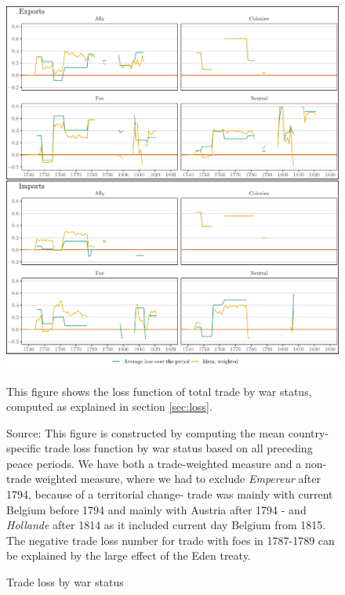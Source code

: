 \documentclass[12pt,a4paper,notitlepage,english]{article}
\newcommand{\fontsmall}{\fontsize{10pt}{12pt}\selectfont}
\newcommand{\source}[1]{\caption*{\footnotesize Source: {#1}} }
\begin{document}
\begin{appendix}
\begin{figure}[h!]
\centering
\caption{Trade loss by war status}
\label{fig:loss_by_war_status_X_I}
\includegraphics[scale=.2]{loss_by_war_status_X_I_combined}
\begin{minipage}{.95\textwidth}
\fontsmall 
This figure shows the loss function of total trade by war status, computed as explained in section \ref{sec:loss}. 
\source{This figure is constructed by computing the mean country-specific trade loss function by war status based on all preceding peace periods.
We have both a trade-weighted measure and a non-trade weighted measure, where we had to exclude \textit{Empereur} after 1794, because of a territorial change- trade was mainly with current Belgium before 1794 and mainly with Austria after 1794 - and \textit{Hollande} after 1814 as it included current day Belgium from 1815.
The negative trade loss number for trade with foes in 1787-1789 can be explained by the large effect of the Eden treaty.}
\end{minipage}
\end{figure}





\end{appendix}
\end{document}
